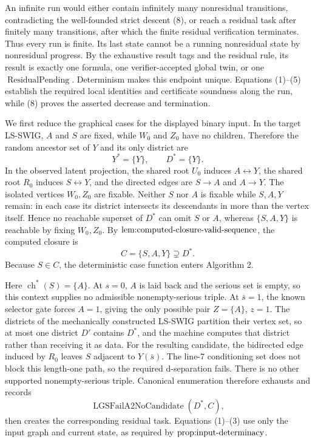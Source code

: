 An infinite run would either contain infinitely many nonresidual transitions, contradicting the well-founded strict descent (8), or reach a residual task after finitely many transitions, after which the finite residual verification terminates.  Thus every run is finite.  Its last state cannot be a running nonresidual state by nonresidual progress.  By the exhaustive result tags and the residual rule, its result is exactly one formula, one verifier-accepted global twin, or one \(\operatorname{ResidualPending}\).  Determinism makes this endpoint unique.  Equations (1)--(5) establish the required local identities and certificate soundness along the run, while (8) proves the asserted decrease and termination.

We first reduce the graphical cases for the displayed binary input.  In the target LS-SWIG, \(A\) and \(S\) are fixed, while \(W_0\) and \(Z_0\) have no children.  Therefore the random ancestor set of \(Y\) and its only district are
\[
 Y^*=\{Y\},\qquad D^*=\{Y\}.
\tag{1}
\]
In the observed latent projection, the shared root \(U_0\) induces \(A\leftrightarrow Y\), the shared root \(R_0\) induces \(S\leftrightarrow Y\), and the directed edges are \(S\to A\) and \(A\to Y\).  The isolated vertices \(W_0,Z_0\) are fixable.  Neither \(S\) nor \(A\) is fixable while \(S,A,Y\) remain: in each case its district intersects its descendants in more than the vertex itself.  Hence no reachable superset of \(D^*\) can omit \(S\) or \(A\), whereas \(\{S,A,Y\}\) is reachable by fixing \(W_0,Z_0\).  By \(\textnormal{lem:computed-closure-valid-sequence}\), the computed closure is
\[
 C=\{S,A,Y\}\supsetneq D^*.
\tag{2}
\]
Because \(S\in C\), the deterministic case function enters Algorithm 2.

Here \(\operatorname{ch}^*(S)=\{A\}\).  At \(s=0\), \(A\) is laid back and the serious set is empty, so this context supplies no admissible nonempty-serious triple.  At \(\bar s=1\), the known selector gate forces \(A=1\), giving the only possible pair \(Z=\{A\}\), \(z=1\).  The districts of the mechanically constructed LS-SWIG partition their vertex set, so at most one district \(D'\) contains \(D^*\), and the machine computes that district rather than receiving it as data.  For the resulting candidate, the bidirected edge induced by \(R_0\) leaves \(S\) adjacent to \(Y(\bar s)\).  The line-7 conditioning set does not block this length-one path, so the required d-separation fails.  There is no other supported nonempty-serious triple.  Canonical enumeration therefore exhausts and records
\[
 \operatorname{LGSFailA2NoCandidate}(D^*,C),
\tag{3}
\]
then creates the corresponding residual task.  Equations (1)--(3) use only the input graph and current state, as required by \(\textnormal{prop:input-determinacy}\).

